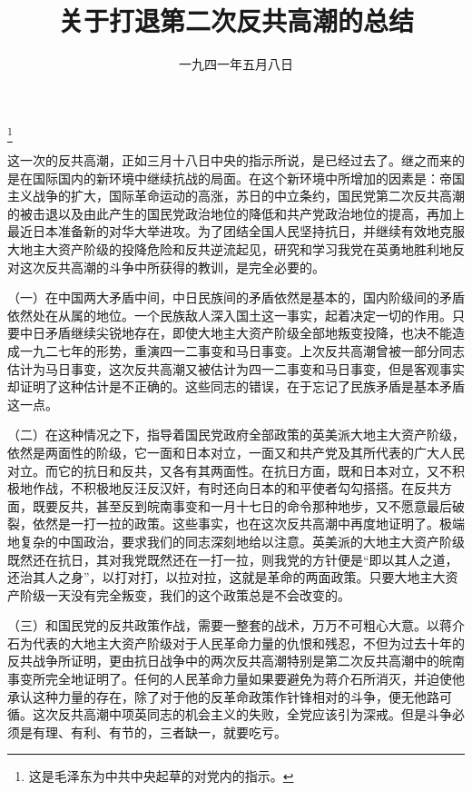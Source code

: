 
\title{关于打退第二次反共高潮的总结}
\date{一九四一年五月八日}
\thanks{这是毛泽东为中共中央起草的对党内的指示。}
\maketitle


这一次的反共高潮，正如三月十八日中央的指示所说，是已经过去了。继之而来的是在国际国内的新环境中继续抗战的局面。在这个新环境中所增加的因素是：帝国主义战争的扩大，国际革命运动的高涨，苏日的中立条约，国民党第二次反共高潮的被击退以及由此产生的国民党政治地位的降低和共产党政治地位的提高，再加上最近日本准备新的对华大举进攻。为了团结全国人民坚持抗日，并继续有效地克服大地主大资产阶级的投降危险和反共逆流起见，研究和学习我党在英勇地胜利地反对这次反共高潮的斗争中所获得的教训，是完全必要的。

（一）在中国两大矛盾中间，中日民族间的矛盾依然是基本的，国内阶级间的矛盾依然处在从属的地位。一个民族敌人深入国土这一事实，起着决定一切的作用。只要中日矛盾继续尖锐地存在，即使大地主大资产阶级全部地叛变投降，也决不能造成一九二七年的形势，重演四一二事变和马日事变。上次反共高潮曾被一部分同志估计为马日事变，这次反共高潮又被估计为四一二事变和马日事变，但是客观事实却证明了这种估计是不正确的。这些同志的错误，在于忘记了民族矛盾是基本矛盾这一点。

（二）在这种情况之下，指导着国民党政府全部政策的英美派大地主大资产阶级，依然是两面性的阶级，它一面和日本对立，一面又和共产党及其所代表的广大人民对立。而它的抗日和反共，又各有其两面性。在抗日方面，既和日本对立，又不积极地作战，不积极地反汪反汉奸，有时还向日本的和平使者勾勾搭搭。在反共方面，既要反共，甚至反到皖南事变和一月十七日的命令那种地步，又不愿意最后破裂，依然是一打一拉的政策。这些事实，也在这次反共高潮中再度地证明了。极端地复杂的中国政治，要求我们的同志深刻地给以注意。英美派的大地主大资产阶级既然还在抗日，其对我党既然还在一打一拉，则我党的方针便是“即以其人之道，还治其人之身”，以打对打，以拉对拉，这就是革命的两面政策。只要大地主大资产阶级一天没有完全叛变，我们的这个政策总是不会改变的。

（三）和国民党的反共政策作战，需要一整套的战术，万万不可粗心大意。以蒋介石为代表的大地主大资产阶级对于人民革命力量的仇恨和残忍，不但为过去十年的反共战争所证明，更由抗日战争中的两次反共高潮特别是第二次反共高潮中的皖南事变所完全地证明了。任何的人民革命力量如果要避免为蒋介石所消灭，并迫使他承认这种力量的存在，除了对于他的反革命政策作针锋相对的斗争，便无他路可循。这次反共高潮中项英同志的机会主义的失败，全党应该引为深戒。但是斗争必须是有理、有利、有节的，三者缺一，就要吃亏。


